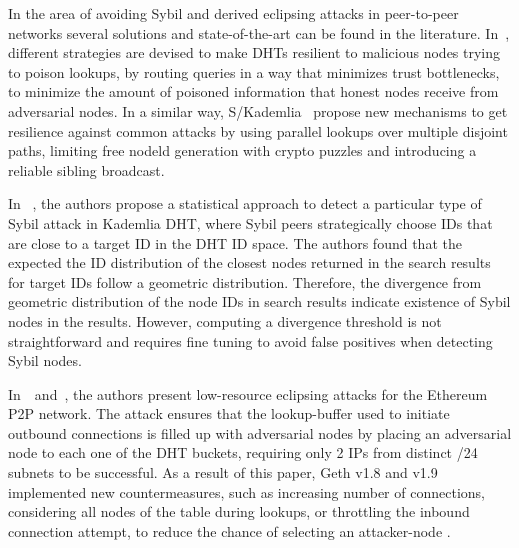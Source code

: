 






In the area of avoiding Sybil and derived eclipsing attacks in peer-to-peer networks several solutions and state-of-the-art can be found in the literature.
In~\cite{danezis2005sybil},  different strategies are devised to make DHTs resilient to malicious nodes trying to poison lookups,  by routing queries in a way that minimizes trust bottlenecks,  to minimize the amount of poisoned information that honest nodes receive from adversarial nodes.
In a similar way,  S/Kademlia~\cite{skad} propose new mechanisms to get resilience against common attacks by using parallel lookups over multiple disjoint paths,  limiting free nodeld generation with crypto puzzles and introducing a reliable sibling broadcast.

In ~\cite{cholez2010efficient},  the authors propose  a statistical approach to detect a particular type of Sybil attack in  Kademlia DHT,  where Sybil peers strategically choose IDs that are close to a target ID in the DHT ID space.
The authors found that the expected the ID distribution of the closest nodes returned in the search results for target IDs follow a geometric distribution. Therefore, the divergence from geometric distribution of the node IDs in search results indicate existence of Sybil nodes in the results.  However, computing a divergence threshold is not straightforward and requires fine tuning to avoid false positives when detecting Sybil nodes.

In~\cite{marcus2018low}~and~\cite{henningsen2019eclipsing},  the authors present low-resource eclipsing attacks for the Ethereum P2P network.  
The attack ensures that the lookup-buffer used to initiate outbound connections is filled up with adversarial nodes by placing an adversarial node to each one of the DHT buckets, requiring only  2 IPs from distinct /24 subnets to be successful.
As a result of this paper, Geth v1.8 and v1.9 implemented new countermeasures,  such as  increasing number of connections, considering all nodes of the table during lookups,  or throttling the inbound connection attempt,  to reduce the chance of selecting an attacker-node .

